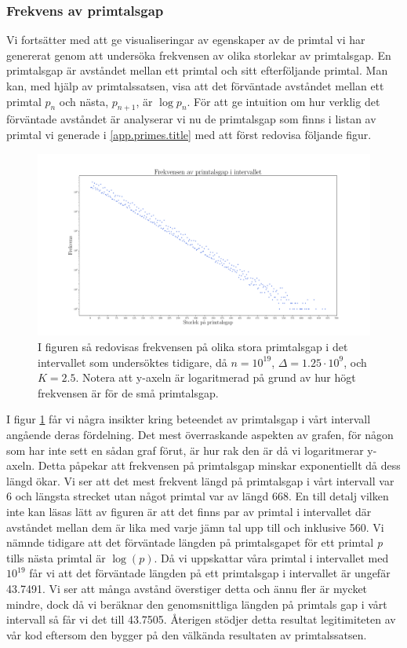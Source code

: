 \subsubsection{Frekvens av primtalsgap}

Vi fortsätter med att ge visualiseringar av egenskaper av de primtal vi har genererat genom att undersöka frekvensen av olika storlekar av primtalsgap. 
En primtalsgap är avståndet mellan ett primtal och sitt efterföljande primtal.
Man kan, med hjälp av primtalssatsen, visa att det förväntade avståndet mellan ett primtal \(p_n\) och nästa, \(p_{n+1}\), är \(\log p_n\).
För att ge intuition om hur verklig det förväntade avståndet är analyserar vi nu de primtalsgap som finns i listan av primtal vi generade i \ref{app.primes.title} med att först redovisa följande figur.

\begin{figure}[H]
    \centering
    \includegraphics[width = \textwidth]{coen/Images/GapsNoKapps.pdf}
    \caption{I figuren så redovisas frekvensen på olika stora primtalsgap i det intervallet som undersöktes tidigare, då \(n = 10^{19}\), \(\Delta = 1.25\cdot10^{9}\), och \(K = 2.5\). Notera att y-axeln är logaritmerad på grund av hur högt frekvensen är för de små primtalsgap. }
    \label{fig:res.gap}
\end{figure}

I figur \ref{fig:res.gap} får vi några insikter kring beteendet av primtalsgap i vårt intervall angående deras fördelning. 
Det mest överraskande aspekten av grafen, för någon som har inte sett en sådan graf förut, är hur rak den är då vi logaritmerar y-axeln.
Detta påpekar att frekvensen på primtalsgap minskar exponentiellt då dess längd ökar. 
Vi ser att det mest frekvent längd på primtalsgap i vårt intervall var 6 och längsta strecket utan något primtal var av längd 668.
En till detalj vilken inte kan läsas lätt av figuren är att det finns par av primtal i intervallet där avståndet mellan dem är lika med varje jämn tal upp till och inklusive 560.
Vi nämnde tidigare att det förväntade längden på primtalsgapet för ett primtal \textit{p} tills nästa primtal är \(\log(p)\). 
Då vi uppskattar våra primtal i intervallet med \(10^{19}\) får vi att det förväntade längden på ett primtalsgap i intervallet är ungefär 43.7491. 
Vi ser att många avstånd överstiger detta och ännu fler är mycket mindre, dock då vi beräknar den genomsnittliga längden på primtals gap i vårt intervall så får vi det till 43.7505.
Återigen stödjer detta resultat legitimiteten av vår kod eftersom den bygger på den välkända resultaten av primtalssatsen.


